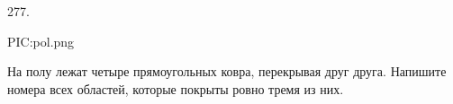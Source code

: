 277. \begin{center}
{{PIC:pol.png}}
\end{center}
На полу лежат четыре прямоугольных ковра, перекрывая друг друга. Напишите номера всех областей, которые покрыты ровно тремя из них.\newpage\noindent
